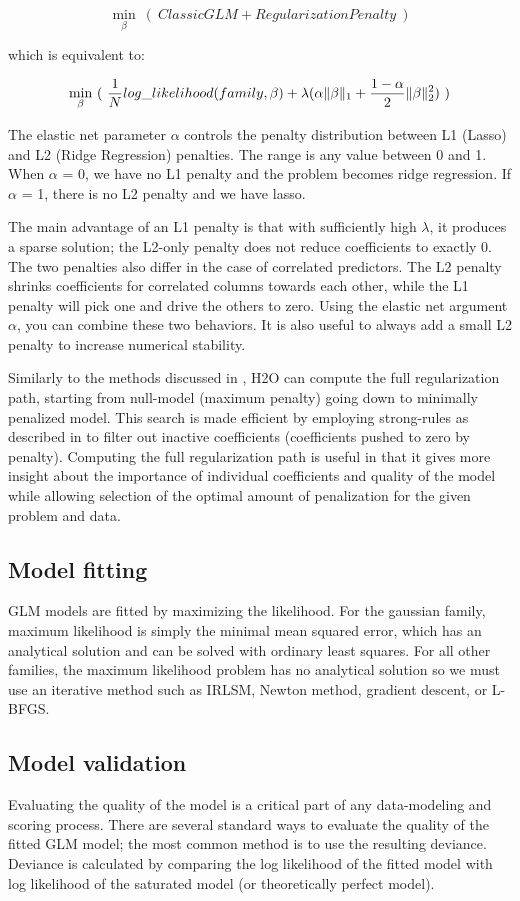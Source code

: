 \[ \min\limits_{\beta}\ (\ Classic GLM  + Regularization Penalty \ )\]

which is equivalent to:

\[ \min\limits_{\beta}\ (\ {{1\over{N}} log\_likelihood(family,\beta)  + \lambda (\alpha \| \beta \|_1} + {1- \alpha \over 2} \| \beta \|_2^2) \ )\]

\bigskip
The elastic net parameter $\alpha$ controls the penalty distribution between L1 (Lasso) and L2 (Ridge Regression)
penalties. The range is any value between 0 and 1. When $\alpha$ = 0, we have no L1 penalty and the problem becomes
ridge regression. If $\alpha$ = 1, there is no L2 penalty and we have lasso.

The main advantage of an L1 penalty is that with sufficiently high $\lambda$, it produces a sparse solution; the
L2-only penalty does not reduce coefficients to exactly 0. The two penalties also differ in the case of correlated
predictors. The L2 penalty shrinks coefficients for correlated columns towards each other, while the L1 penalty
will pick one and drive the others to zero. Using the elastic net argument $\alpha$, you can combine these two
behaviors. It is also useful to always add a small L2 penalty to increase numerical stability.

Similarly to the methods discussed in , H2O can compute the full regularization path, starting
from null-model (maximum penalty) going down to minimally penalized model. This search is made efficient by
employing strong-rules as described in  to filter out inactive coefficients (coefficients pushed
to zero by penalty). Computing the full regularization path is useful in that it gives more insight about the
importance of individual coefficients and quality of the model while allowing selection of the optimal amount of
penalization for the given problem and data.

\subsection{Model fitting}
GLM models are fitted by maximizing the likelihood. For the gaussian family, maximum likelihood is simply the
minimal mean squared error, which has an analytical solution and can be solved with ordinary least squares. For all
other families, the maximum likelihood problem has no analytical solution so we must use an iterative method such
as IRLSM, Newton method, gradient descent, or L-BFGS.

\subsection{Model validation}
Evaluating the quality of the model is a critical part of any data-modeling and scoring process. There are several
standard ways to evaluate the quality of the fitted GLM model; the most common method is to use the resulting
deviance. Deviance is calculated by comparing the log likelihood of the fitted model with log likelihood of the
saturated model (or theoretically perfect model).

